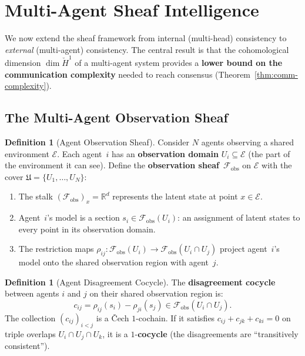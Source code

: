 \documentclass[11pt,a4paper]{article}
\theoremstyle{plain}
\theoremstyle{definition}
\newtheorem{definition}[theorem]{Definition}
\theoremstyle{remark}
\newcommand{\R}{\mathbb{R}}
\newcommand{\cF}{\mathcal{F}}
\newcommand{\cE}{\mathcal{E}}
\newcommand{\fU}{\mathfrak{U}}
\newcommand{\CechH}{\check{H}}
\begin{document}
\section{Multi-Agent Sheaf Intelligence}\label{sec:multiagent}

We now extend the sheaf framework from internal (multi-head) consistency to \emph{external} (multi-agent) consistency. The central result is that the cohomological dimension $\dim \CechH^1$ of a multi-agent system provides a \textbf{lower bound on the communication complexity} needed to reach consensus (Theorem~\ref{thm:comm-complexity}).

\subsection{The Multi-Agent Observation Sheaf}

\begin{definition}[Agent Observation Sheaf]\label{def:agent-sheaf}
Consider $N$ agents observing a shared environment $\cE$. Each agent~$i$ has an \textbf{observation domain} $U_i \subseteq \cE$ (the part of the environment it can see). Define the \textbf{observation sheaf}~$\cF_{\mathrm{obs}}$ on $\cE$ with the cover $\fU = \{U_1, \ldots, U_N\}$:
\begin{enumerate}[label=(\roman*),nosep]
\item The stalk $(\cF_{\mathrm{obs}})_x = \R^d$ represents the latent state at point $x \in \cE$.
\item Agent~$i$'s model is a section $s_i \in \cF_{\mathrm{obs}}(U_i)$: an assignment of latent states to every point in its observation domain.
\item The restriction maps $\rho_{ij}: \cF_{\mathrm{obs}}(U_i) \to \cF_{\mathrm{obs}}(U_i \cap U_j)$ project agent~$i$'s model onto the shared observation region with agent~$j$.
\end{enumerate}
\end{definition}

\begin{definition}[Agent Disagreement Cocycle]\label{def:agent-cocycle}
The \textbf{disagreement cocycle} between agents $i$ and $j$ on their shared observation region is:
\[
c_{ij} = \rho_{ij}(s_i) - \rho_{ji}(s_j) \in \cF_{\mathrm{obs}}(U_i \cap U_j).
\]
The collection $(c_{ij})_{i < j}$ is a \v{C}ech $1$-cochain. If it satisfies $c_{ij} + c_{jk} + c_{ki} = 0$ on triple overlaps $U_i \cap U_j \cap U_k$, it is a $1$-\textbf{cocycle} (the disagreements are ``transitively consistent'').
\end{definition}
\end{document}
